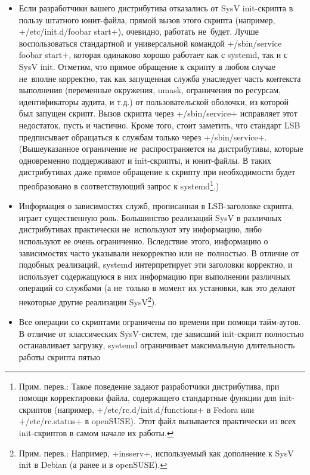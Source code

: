 \documentclass[10pt,oneside,a4paper]{article}
\begin{document}
\begin{itemize}
	\item Если разработчики вашего дистрибутива отказались от SysV
		init-скрипта в пользу штатного юнит-файла, прямой вызов этого
		скрипта (например, +/etc/init.d/foobar start+), очевидно,
		работать не~будет. Лучше воспользоваться стандартной и
		универсальной командой +/sbin/service foobar start+, которая
		одинаково хорошо работает как с systemd, так и с SysV init.
		Отметим, что прямое обращение к скрипту в любом случае не~вполне
		корректно, так как запущенная служба унаследует часть контекста
		выполнения (переменные окружения, umask, ограничения по
		ресурсам, идентификаторы аудита, и т.д.) от пользовательской
		оболочки, из которой был запущен скрипт. Вызов скрипта через 
		+/sbin/service+ исправляет этот недостаток, пусть и частично.
		Кроме того, стоит заметить, что стандарт LSB предписывает
		обращаться к службам только через +/sbin/service+.
		(Вышеуказанное ограничение \emph{не}~распространяется на
		дистрибутивы, которые одновременно поддерживают и init-скрипты,
		и юнит-файлы. В таких дистрибутивах даже прямое обращение к
		скрипту при необходимости будет преобразовано в соответствующий
		запрос к systemd\footnote{Прим. перев.: Такое поведение
		задают разработчики дистрибутива, при помощи
		корректировки файла, содержащего стандартные функции для
		init-скриптов (например, +/etc/rc.d/init.d/functions+ в
		Fedora или +/etc/rc.status+ в openSUSE). Этот файл
		вызывается практически из всех init-скриптов в самом начале их
		работы.}.)
	\item Информация о зависимостях служб, прописанная в LSB-заголовке
		скрипта, играет существенную роль. Большинство реализаций SysV
		в различных дистрибутивах практически не~используют эту
		информацию, либо используют ее очень ограниченно. Вследствие
		этого, информацию о зависимостях часто указывали некорректно
		или не~полностью. В отличие от подобных реализаций, systemd
		интерпретирует эти заголовки корректно, и использует
		содержащуюся в них информацию при выполнении различных операций
		со службами (а не~только в момент их установки, как это делают
		некоторые другие реализации SysV\footnote{Прим. перев.:
		Например, +insserv+, используемый как дополнение к SysV init в
		Debian (а ранее и в openSUSE).}).
	\item Все операции со скриптами ограничены по времени при помощи
		тайм-аутов. В отличие от классических SysV-систем, где зависший
		init-скрипт полностью останавливает загрузку, systemd
		ограничивает максимальную длительность работы скрипта пятью

\end{itemize}
\end{document}
